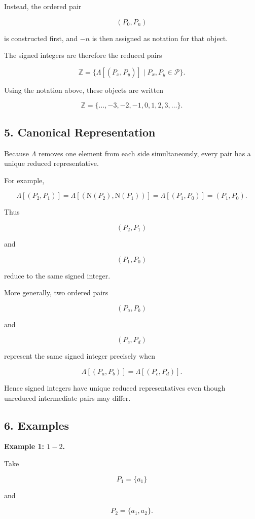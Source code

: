 \documentclass[12pt]{article}
\newcommand{\Nu}{\mathrm{N}}
\begin{document}
Instead, the ordered pair

\[
(P_0,P_n)
\]

is constructed first, and \(-n\) is then assigned as notation for that object.

The signed integers are therefore the reduced pairs

\[
\boxed{
\mathbb Z
=
\{
\Lambda[(P_x,P_y)]
\mid
P_x,P_y\in\mathcal P
\}.
}
\]

Using the notation above, these objects are written

\[
\mathbb Z
=
\{\ldots,-3,-2,-1,0,1,2,3,\ldots\}.
\]

\subsection*{5. Canonical Representation}

Because \(\Lambda\) removes one element from each side simultaneously, every pair has a unique reduced representative.

For example,

\[
\Lambda[(P_2,P_1)]
=
\Lambda[(\Nu(P_2),\Nu(P_1))]
=
\Lambda[(P_1,P_0)]
=
(P_1,P_0).
\]

Thus

\[
(P_2,P_1)
\]

and

\[
(P_1,P_0)
\]

reduce to the same signed integer.

More generally, two ordered pairs

\[
(P_a,P_b)
\]

and

\[
(P_c,P_d)
\]

represent the same signed integer precisely when

\[
\boxed{
\Lambda[(P_a,P_b)]
=
\Lambda[(P_c,P_d)].
}
\]

Hence signed integers have unique reduced representatives even though unreduced intermediate pairs may differ.

\subsection*{6. Examples}

\textbf{Example 1: \(1-2\).}

Take

\[
P_1=\{a_1\}
\]

and

\[
P_2=\{a_1,a_2\}.
\]
\end{document}
